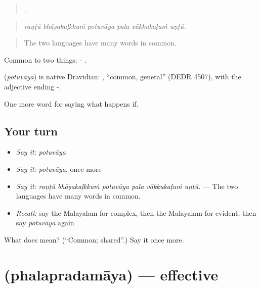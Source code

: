 \begin{quote}
     .
\end{quote}

\begin{quote}
\emph{raṇṭŭ bhāṣakaḷkkuṁ potuvāya pala vākkukaḷuṁ uṇṭŭ.}
\end{quote}

\begin{quote}
The two languages have many words in common.
\end{quote}

Common to two things: - .

\begin{cousinweb}
\textbf{} (\emph{potuvāya}) is native Dravidian: , \textquotedblleft{}common, general\textquotedblright{} (DEDR 4507), with the adjective ending -.
\end{cousinweb}

\begin{grammarlens}[title={What you've built}]
One more word for saying what happens if.
\end{grammarlens}

\subsection*{Your turn}
\begin{itemize}
\raggedright
  \item \emph{Say it:} \emph{potuvāya}
  \item \emph{Say it:} \emph{potuvāya}, once more
  \item \emph{Say it:} \emph{raṇṭŭ bhāṣakaḷkkuṁ potuvāya pala vākkukaḷuṁ uṇṭŭ.} — The two languages have many words in common.
  \item \emph{Recall:} say the Malayalam for complex, then the Malayalam for evident, then say \emph{potuvāya} again
\end{itemize}

\begin{tcolorbox}[breakable,colback=teal!4,colframe=teal!35!black,title={Before you move on}]
What does  mean? (\textquotedblleft{}Common; shared\textquotedblright{}.) Say it once more.
\end{tcolorbox}
\section[\texorpdfstring{\ml{ഫലപ്രദമായ} (phalapradamāya)}{ഫലപ്രദമായ (phalapradamāya)}]{ (phalapradamāya) — effective}

